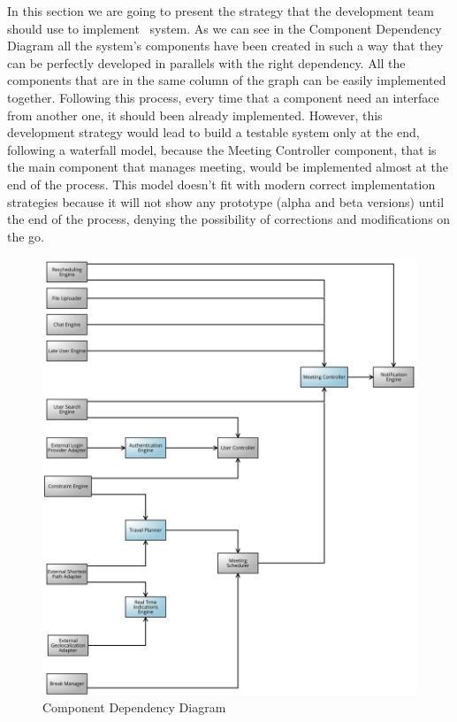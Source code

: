 In this section we are going to present the strategy that the development team should use to implement \projectname~system. As we can see in the Component Dependency Diagram all the system's components have been created in such a way that they can be perfectly developed in parallels with the right dependency. All the components that are in the same column of the graph can be easily implemented together. Following this process, every time that a component need an interface from another one, it should been already implemented. However, this development strategy would lead to build a testable system only at the end, following a waterfall model, because the Meeting Controller component, that is the main component that manages meeting, would be implemented almost at the end of the process. This model doesn't fit with modern correct implementation strategies because it will not show any prototype (alpha and beta versions) until the end of the process, denying the possibility of corrections and modifications on the go.\\

\begin{figure}[!h]
	\centering\includegraphics[scale = 0.22]{Images/UMLDiagrams/DependencyDiagramColored.png}
	\caption{Component Dependency Diagram}
\end{figure}


